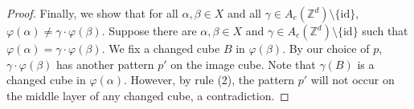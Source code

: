 \documentclass[10pt,a4paper]{amsart}
\begin{document}
\begin{proof}
Finally, we show that for all $\alpha,\beta\in X$ and all $\gamma\in A_e(\mathbb{Z}^d)\setminus\{\mathrm{id}\}$, $\varphi(\alpha)\ne\gamma\cdot\varphi(\beta)$. Suppose there are $\alpha,\beta\in X$ and $\gamma\in A_e(\mathbb{Z}^d)\setminus\{\mathrm{id}\}$ such that $\varphi(\alpha)=\gamma\cdot\varphi(\beta)$. We fix a changed cube $B$ in $\varphi(\beta)$. By our choice of $p$, $\gamma\cdot\varphi(\beta)$ has another pattern $p'$ on the image cube. Note that $\gamma(B)$ is a changed cube in $\varphi(\alpha)$. However, by rule (2), the pattern $p'$ will not occur on the middle layer of any changed cube, a contradiction.
\end{proof}
\end{document}
